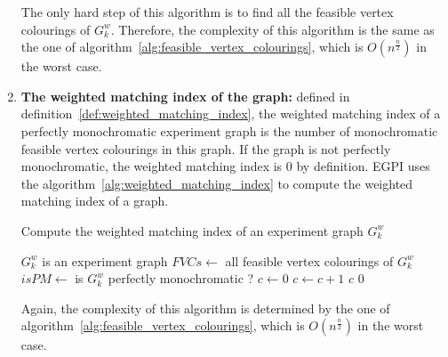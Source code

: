 \begin{enumerate}
        The only hard step of this algorithm is to find all the feasible vertex colourings of $G_k^w$.
        Therefore, the complexity of this algorithm is the same as the one of algorithm~\ref{alg:feasible_vertex_colourings}, which is $O\left(n^\frac{n}{2}\right)$ in the worst case.

    \item \textbf{The weighted matching index of the graph:} defined in definition~\ref{def:weighted_matching_index}, the weighted matching index of a perfectly monochromatic experiment graph is the number of monochromatic feasible vertex colourings in this graph.
        If the graph is not perfectly monochromatic, the weighted matching index is $0$ by definition.
        EGPI uses the algorithm~\ref{alg:weighted_matching_index} to compute the weighted matching index of a graph.
        \begin{algorithm}
            \caption{Compute the weighted matching index of an experiment graph $G_k^w$}
            \label{alg:weighted_matching_index}
            \begin{algorithmic}
                \Require $G_k^w$ is an experiment graph
                \State $FVCs \gets$ all feasible vertex colourings of $G_k^w$
                \State $isPM \gets$ is $G_k^w$ perfectly monochromatic ?
                    \State $c \gets 0$
                            \State $c \gets c + 1$
                        \EndIf
                    \EndFor
                    \State \Return $c$
                \Else
                    \State \Return $0$
                \EndIf
            \end{algorithmic}
        \end{algorithm}

        Again, the complexity of this algorithm is determined by the one of algorithm~\ref{alg:feasible_vertex_colourings}, which is $O\left(n^\frac{n}{2}\right)$ in the worst case.


\end{enumerate}
